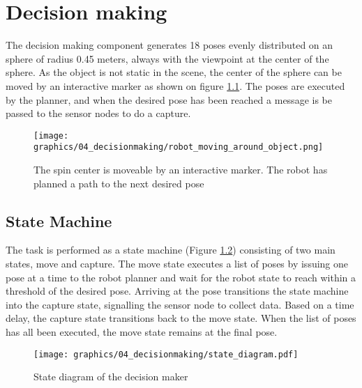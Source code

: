 \chapter{Decision making}
The decision making component generates 18 poses evenly distributed on an sphere of radius 0.45 meters, always with the viewpoint at the center of the sphere. As the object is not static in the scene, the center of the sphere can be moved by an interactive marker as shown on figure \ref{fig:robot_moving_around_object}. The poses are executed by the planner, and when the desired pose has been reached a message is be passed to the sensor nodes to do a capture.


\begin{figure}[htb]
	\begin{center}
		\texttt{[image: graphics/04\_decisionmaking/robot\_moving\_around\_object.png]}%
		\caption{The spin center is moveable by an interactive marker. The robot has planned a path to the next desired pose}
		\label{fig:robot_moving_around_object}
	\end{center}
\end{figure}


\section{State Machine}
The task is performed as a state machine (Figure \ref{fig:state_diagram}) consisting of two main states, move and capture. The move state executes a list of poses by issuing one pose at a time to the robot planner and wait for the robot state to reach within a threshold of the desired pose. Arriving at the pose transitions the state machine into the capture state, signalling the sensor node to collect data. Based on a time delay, the capture state transitions back to the move state. When the list of poses has all been executed, the move state remains at the final pose.


\begin{figure}[htb]
	\begin{center}
		\texttt{[image: graphics/04\_decisionmaking/state\_diagram.pdf]}%
		\caption{State diagram of the decision maker}
		\label{fig:state_diagram}
	\end{center}
\end{figure}

